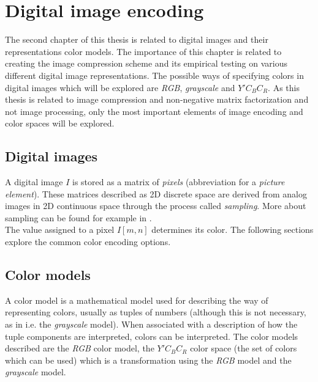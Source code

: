 \documentclass[thesis=M,english]{FITthesis}[2012/10/20]
\begin{document}


\chapter{Digital image encoding}
\label{ch:image-encoding}
The second chapter of this thesis is related to digital images and their
representations color models. The importance of this chapter is related to
creating the image compression scheme and its empirical testing on
various different digital image representations. The possible ways of
specifying colors in digital images which will be explored are \emph{RGB},
\emph{grayscale} and $Y'C_BC_R$. As this thesis is related to image
compression and non-negative matrix factorization and not image processing,
only the most important elements of image encoding and color spaces will be explored.


\section{Digital images}
A digital image $I$ is stored as a matrix of \emph{pixels} (abbreviation for a \emph{picture
element}). These matrices described as 2D discrete space are derived from analog
images in 2D continuous space through the process called \emph{sampling}. More about
sampling can be found for example in \cite{img:img-processing}.
\\

The value assigned to a pixel $I[m,n]$ determines its color. The following sections
explore the common color encoding options.


\section{Color models}
A color model is a mathematical model used for describing the way of representing
colors, usually as tuples of numbers (although this is not necessary, as in i.e.
the \emph{grayscale} model). When associated with a description of how the tuple
components are interpreted, colors can be interpreted. The color models described
are the \emph{RGB} color model, the $Y'C_{B}C_{R}$ color space (the set of colors
which can be used) which is a transformation using the \emph{RGB} model and the
\emph{grayscale} model.
\end{document}

